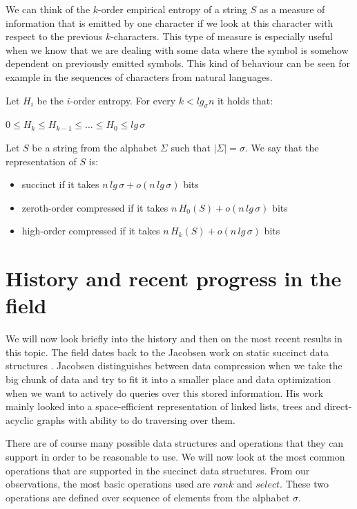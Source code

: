 We can think of the $k$-order empirical entropy of a string $S$ as a measure of information that is emitted by one character if we look at this character with respect to the previous $k$-characters. This type of measure is especially useful when we know that we are dealing with some data where the symbol is somehow dependent on previously emitted symbols. This kind of behaviour can be seen for example in the sequences of characters from natural languages.

\begin{theorem}
Let $H_i$ be the $i$-order entropy. For every $k<lg_{\sigma}n$ it holds that:
\begin{center}
$0\leq H_{k}\leq H_{k-1}\leq \ldots\leq H_0 \leq lg\, \sigma$
\end{center}
\end{theorem}

\begin{theorem}
Let $S$ be a string from the alphabet $\Sigma$ such that $|\Sigma|=\sigma$. We say that the representation of $S$ is:
\begin{itemize}
    \item succinct if it takes $n\,lg\,\sigma + o(n\,lg\,\sigma)$ bits
    \item zeroth-order compressed if it takes $n\,H_0(S) + o(n\,lg\,\sigma)$ bits
    \item high-order compressed if it takes $n\,H_k(S) + o(n\,lg\,\sigma)$ bits
\end{itemize}
\end{theorem}

\section{History and recent progress in the field}

We will now look briefly into the history and then on the most recent results in this topic. The field dates back to the Jacobsen work on static succinct data structures \cite{jacobson1988succinct}. Jacobsen distinguishes between data compression when we take the big chunk of data and try to fit it into a smaller place and
data optimization when we want to actively do queries over this stored information. His work mainly looked into a space-efficient representation of linked lists, trees and direct-acyclic graphs with ability to do traversing over them.

There are of course many possible data structures and operations that they can support in order to be reasonable to use. We will now look at the most common operations that are supported in the succinct data structures. From our observations, the most basic operations used are $rank$ and $select$. These two operations are defined over sequence of elements from the alphabet $\sigma$.

